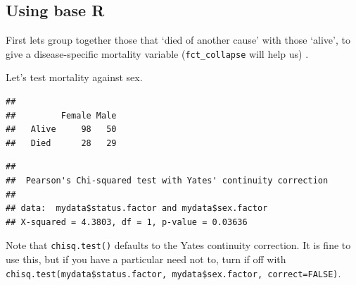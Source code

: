 \documentclass[]{book}
\makeatletter
\newenvironment{Shaded}{\begin{snugshade}}{\end{snugshade}}
\newcommand{\KeywordTok}[1]{\textcolor[rgb]{0.13,0.29,0.53}{\textbf{#1}}}
\newcommand{\StringTok}[1]{\textcolor[rgb]{0.31,0.60,0.02}{#1}}
\newcommand{\OperatorTok}[1]{\textcolor[rgb]{0.81,0.36,0.00}{\textbf{#1}}}
\newcommand{\NormalTok}[1]{#1}
\newenvironment{kframe}{%
\medskip{}
\setlength{\fboxsep}{.8em}
 \def\at@end@of@kframe{}%
 \ifinner\ifhmode%
  \def\at@end@of@kframe{\end{minipage}}%
  \begin{minipage}{\columnwidth}%
 \fi\fi%
 \def\FrameCommand##1{\hskip\@totalleftmargin \hskip-\fboxsep
 \colorbox{shadecolor}{##1}\hskip-\fboxsep
     \hskip-\linewidth \hskip-\@totalleftmargin \hskip\columnwidth}%
 \MakeFramed {\advance\hsize-\width
   \@totalleftmargin\z@ \linewidth\hsize
   \@setminipage}}%
 {\par\unskip\endMakeFramed%
 \at@end@of@kframe}
\renewenvironment{Shaded}{\begin{kframe}}{\end{kframe}}
\makeatother
\begin{document}
\subsection{Using base R}\label{using-base-r}

First lets group together those that `died of another cause' with those
`alive', to give a disease-specific mortality variable
(\texttt{fct\_collapse} will help us) .

\begin{Shaded}
\end{Shaded}

Let's test mortality against sex.

\begin{Shaded}
\end{Shaded}

\begin{verbatim}
##        
##         Female Male
##   Alive     98   50
##   Died      28   29
\end{verbatim}

\begin{Shaded}
\end{Shaded}

\begin{verbatim}
## 
##  Pearson's Chi-squared test with Yates' continuity correction
## 
## data:  mydata$status.factor and mydata$sex.factor
## X-squared = 4.3803, df = 1, p-value = 0.03636
\end{verbatim}

Note that \texttt{chisq.test()} defaults to the Yates continuity
correction. It is fine to use this, but if you have a particular need
not to, turn if off with
\texttt{chisq.test(mydata\$status.factor,\ mydata\$sex.factor,\ correct=FALSE)}.
\end{document}
